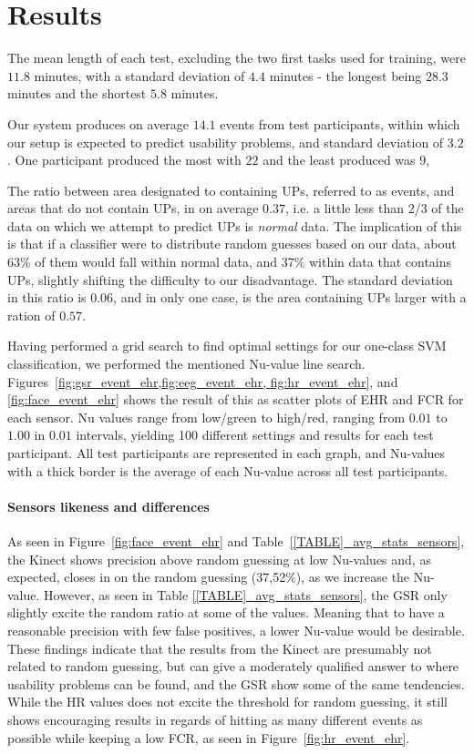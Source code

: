 \section{Results}
The mean length of each test, excluding the two first tasks used for training, were $11.8$ minutes, with a standard
deviation of $4.4$ minutes - the longest being $28.3$ minutes and the shortest $5.8$ minutes.

Our system produces on average $14.1$ events from test participants, within which our setup is expected to predict
usability problems, and standard deviation of $3.2$. One participant produced the most with $22$ and the least produced
was $9$,

The ratio between area designated to containing UPs, referred to as events, and areas that do not contain UPs, in on
average $0.37$, i.e. a little less than 2/3 of the data on which we attempt to predict UPs is \textit{normal} data. The
implication of this is that if a classifier were to distribute random guesses based on our data, about 63\% of them
would fall within normal data, and 37\% within data that contains UPs, slightly shifting the difficulty to our
disadvantage. The standard deviation in this ratio is $0.06$, and in only one case, is the area containing UPs larger
with a ration of $0.57$.



Having performed a grid search to find optimal settings for our one-class SVM classification, we performed the mentioned
Nu-value line search. Figures~\ref{fig:gsr_event_ehr,fig:eeg_event_ehr, fig:hr_event_ehr}, and \ref{fig:face_event_ehr}
shows the result of this as scatter plots of EHR and FCR for each sensor. Nu values range from low/green to high/red,
ranging from $0.01$ to $1.00$ in $0.01$ intervals, yielding 100 different settings and results for each test
participant. All test participants are represented in each graph, and Nu-values with a thick border is the average of
each Nu-value across all test participants.

\paragraph{Sensors likeness and differences}

As seen in Figure~\ref{fig:face_event_ehr} and Table~\ref{[TABLE]_avg_stats_sensors}, the Kinect shows precision above random guessing at low Nu-values and,
as expected, closes in on the random guessing (37,52\%), as we increase the Nu-value. However, as seen in Table
\ref{[TABLE]_avg_stats_sensors}, the GSR only slightly excite the random ratio at some of the values. Meaning that
to have a reasonable precision with few false positives, a lower Nu-value would be desirable.
These findings indicate that the results from the Kinect are presumably not related to random guessing, but can give a moderately qualified answer to where usability problems can be found, and the GSR show some of the same tendencies.
While the HR values does not excite the threshold for random guessing, it still shows encouraging results in regards of hitting as many different events as possible while keeping a low FCR, as seen in Figure~\ref{fig:hr_event_ehr}.

